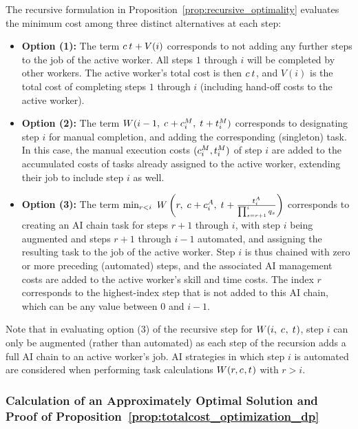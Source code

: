 The recursive formulation in Proposition~\ref{prop:recursive_optimality} evaluates the minimum cost among three distinct alternatives at each step:
\begin{itemize}
    \item \textbf{Option (1):} The term $c_{}\,t_{} + V(i)$ corresponds to not adding any further steps to the job of the active worker.  
    All steps $1$ through $i$ will be completed by other workers. 
    The active worker's total cost is then $c_{}\,t_{}$, and $V(i)$ is the total cost of completing steps $1$ through $i$ (including hand-off costs to the active worker).

    \item \textbf{Option (2):} The term $W(i-1,\; c_{} + c^{M}_{i},\; t_{} + t^{M}_{i})$ corresponds to designating step $i$ for manual completion, and adding the corresponding (singleton) task.
    In this case, the manual execution costs $(c^{M}_{i}, t^{M}_{i})$ of step $i$ are added to the accumulated costs of tasks already assigned to the active worker, extending their job to include step $i$ as well.

    \item \textbf{Option (3):} The term $\min_{r < i} \ W\left(r,\; c_{} + c^{A}_{i},\; t_{} + \frac{t^{A}_{i}}{\prod_{s=r+1}^{i} q_s}\right)$ corresponds to creating an AI chain task for steps $r+1$ through $i$, with step $i$ being augmented and steps $r+1$ through $i-1$ automated, and assigning the resulting task to the job of the active worker. 
    Step $i$ is thus chained with zero or more preceding (automated) steps, and the associated AI management costs are added to the active worker's skill and time costs. 
    The index $r$ corresponds to the highest-index step that is not added to this AI chain, which can be any value between $0$ and $i-1$.
\end{itemize}
Note that in evaluating option (3) of the recursive step for $W(i,\; c_{},\; t_{})$, step $i$ can only be augmented (rather than automated) as each step of the recursion adds a full AI chain to an active worker's job.
AI strategies in which step $i$ is automated are considered when performing task calculations $W(r, c_{}, t_{})$ with $r > i$.


\subsubsection{Calculation of an Approximately Optimal Solution and Proof of Proposition~\ref{prop:totalcost_optimization_dp}}
\label{sec:DP_approximation}

